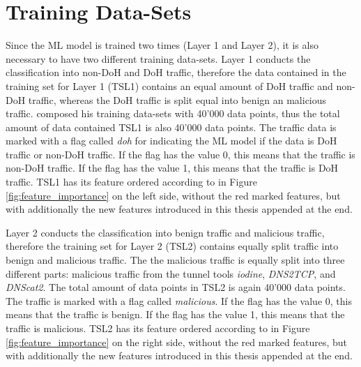 \section{Training Data-Sets} \label{training_ds}
Since the ML model is trained two times (Layer 1 and Layer 2), it is also necessary to have two different training data-sets. Layer 1 conducts the classification into non-DoH and DoH traffic, therefore the data contained in the training set for Layer 1 (TSL1) contains an equal amount of DoH traffic and non-DoH traffic, whereas the DoH traffic is split equal into benign an malicious traffic. \cite{Banadaki_DetectingMalicousDoHTrafficinDNSUsingML} composed his training data-sets with 40'000 data points, thus the total amount of data contained TSL1 is also 40'000 data points. The traffic data is marked with a flag called \textit{doh} for indicating the ML model if the data is DoH traffic or non-DoH traffic. If the flag has the value 0, this means that the traffic is non-DoH traffic. If the flag has the value 1, this means that the traffic is DoH traffic. TSL1 has its feature ordered according to \cite{BehnkeEtAl_FeatureEngineeringMLModelMaliciusDoHTraffic} in Figure \ref{fig:feature_importance} on the left side, without the red marked features, but with additionally the new features introduced in this thesis appended at the end.

Layer 2 conducts the classification into benign traffic and malicious traffic, therefore the training set for Layer 2 (TSL2) contains equally split traffic into benign and malicious traffic. The the malicious traffic is equally split into three different parts: malicious traffic from the tunnel tools \textit{iodine}, \textit{DNS2TCP}, and \textit{DNScat2}. The total amount of data points in TSL2 is again 40'000 data points. The traffic is marked with a flag called \textit{malicious}. If the flag has the value 0, this means that the traffic is benign. If the flag has the value 1, this means that the traffic is malicious. TSL2 has its feature ordered according to \cite{BehnkeEtAl_FeatureEngineeringMLModelMaliciusDoHTraffic} in Figure \ref{fig:feature_importance} on the right side, without the red marked features, but with additionally the new features introduced in this thesis appended at the end.

